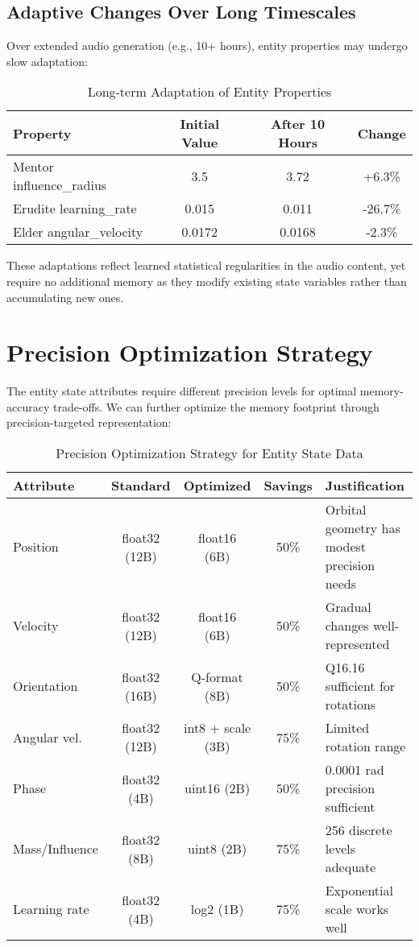 \subsection{Adaptive Changes Over Long Timescales}

Over extended audio generation (e.g., 10+ hours), entity properties may undergo slow adaptation:

\begin{table}[h]
\centering
\begin{tabular}{|l|c|c|c|}
\hline
\textbf{Property} & \textbf{Initial Value} & \textbf{After 10 Hours} & \textbf{Change} \\
\hline
Mentor influence\_radius & 3.5 & 3.72 & +6.3\% \\
Erudite learning\_rate & 0.015 & 0.011 & -26.7\% \\
Elder angular\_velocity & 0.0172 & 0.0168 & -2.3\% \\
\hline
\end{tabular}
\caption{Long-term Adaptation of Entity Properties}
\end{table}

These adaptations reflect learned statistical regularities in the audio content, yet require no additional memory as they modify existing state variables rather than accumulating new ones.

\section{Precision Optimization Strategy}

The entity state attributes require different precision levels for optimal memory-accuracy trade-offs. We can further optimize the memory footprint through precision-targeted representation:

\begin{table}[h]
\centering
\small
\begin{tabular}{|l|c|c|c|p{4.5cm}|}
\hline
\textbf{Attribute} & \textbf{Standard} & \textbf{Optimized} & \textbf{Savings} & \textbf{Justification} \\
\hline
Position & float32 (12B) & float16 (6B) & 50\% & Orbital geometry has modest precision needs \\
\hline
Velocity & float32 (12B) & float16 (6B) & 50\% & Gradual changes well-represented \\
\hline
Orientation & float32 (16B) & Q-format (8B) & 50\% & Q16.16 sufficient for rotations \\
\hline
Angular vel. & float32 (12B) & int8 + scale (3B) & 75\% & Limited rotation range \\
\hline
Phase & float32 (4B) & uint16 (2B) & 50\% & 0.0001 rad precision sufficient \\
\hline
Mass/Influence & float32 (8B) & uint8 (2B) & 75\% & 256 discrete levels adequate \\
\hline
Learning rate & float32 (4B) & log2 (1B) & 75\% & Exponential scale works well \\
\hline
\end{tabular}
\caption{Precision Optimization Strategy for Entity State Data}
\end{table}


